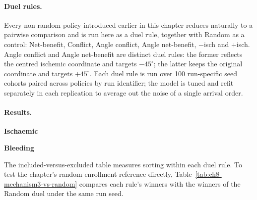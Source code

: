 \paragraph{Duel rules.}
Every non-random policy introduced earlier in this chapter reduces naturally to a
pairwise comparison and is run here as a duel rule, together with Random as a control:
Net-benefit, Conflict, Angle conflict, Angle net-benefit, $-$isch and $+$isch.
Angle conflict and Angle net-benefit are distinct duel rules: the former reflects the
centred ischemic coordinate and targets $-45^\circ$; the latter keeps the original
coordinate and targets $+45^\circ$. Each duel rule is run over 100 run-specific seed
cohorts paired across policies by run identifier; the model is tuned and refit separately
in each replication to average out the noise of a single arrival order.

\paragraph{Results.}


\begin{table}[htbp]
    \centering
    \small
    \setlength{\tabcolsep}{5pt}
    \medskip
    \textbf{Ischaemic}\par\smallskip
    
    \bigskip

    \textbf{Bleeding}\par\smallskip
    
    \caption{Bleeding and any-ischaemic-event rates among duel winners (included)
    and duel losers (excluded) under Mechanism 3, by duel rule. An ischaemic event
    denotes the occurrence of at least one of death, MI or stroke, with each patient
    counted once. Results are averaged over 100
    seeded replications, each enrolling 1,789 winners against 1,789
    losers. Diff.\ is the included-minus-excluded difference; SEM is the standard
    error of the paired per-run differences; $p$ is from a paired two-sided
    Wilcoxon signed-rank test on the per-replication included-minus-excluded
    difference, the non-parametric counterpart that does not assume the difference is
    normally distributed.}
    \label{tab:ch8-duel-composite-comparison}
\end{table}

The included-versus-excluded table measures sorting within each duel rule. To test the
chapter's random-enrollment reference directly, Table~\ref{tab:ch8-mechanism3-vs-random}
compares each rule's winners with the winners of the Random duel under the same run seed.

